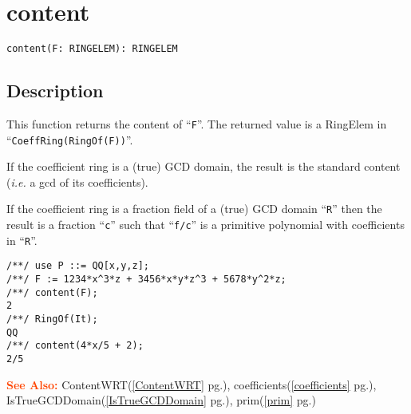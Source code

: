 \documentclass[a4paper]{mybook}
\newenvironment{command}{}{} %
\newcommand\SeeAlso{\par\textcolor{OrangeRed}{\textbf{\large See Also: }}}
\begin{document}
\section{content}
\label{content}
\begin{command} %


\begin{Verbatim}[label=syntax, rulecolor=\color{MidnightBlue},
frame=single]
content(F: RINGELEM): RINGELEM
\end{Verbatim}


\subsection*{Description}

This function returns the content of ``\verb&F&''.
The returned value is a RingElem in ``\verb&CoeffRing(RingOf(F))&''.
\par 
If the coefficient ring is a (true) GCD domain, the result is the standard
content (\textit{i.e.} a gcd of its coefficients).
\par 
If the coefficient ring is a fraction field of a (true) GCD domain ``\verb&R&''
then the result is a fraction ``\verb&c&'' such that ``\verb&f/c&''
is a primitive polynomial with coefficients in ``\verb&R&''.
\begin{Verbatim}[label=example, rulecolor=\color{PineGreen}, frame=single]
/**/ use P ::= QQ[x,y,z];
/**/ F := 1234*x^3*z + 3456*x*y*z^3 + 5678*y^2*z;
/**/ content(F);
2
/**/ RingOf(It);
QQ
/**/ content(4*x/5 + 2);
2/5
\end{Verbatim}


\SeeAlso %
  ContentWRT(\ref{ContentWRT} pg.\pageref{ContentWRT}), 
    coefficients(\ref{coefficients} pg.\pageref{coefficients}), 
    IsTrueGCDDomain(\ref{IsTrueGCDDomain} pg.\pageref{IsTrueGCDDomain}), 
    prim(\ref{prim} pg.\pageref{prim})
\end{command} %
\end{document}
